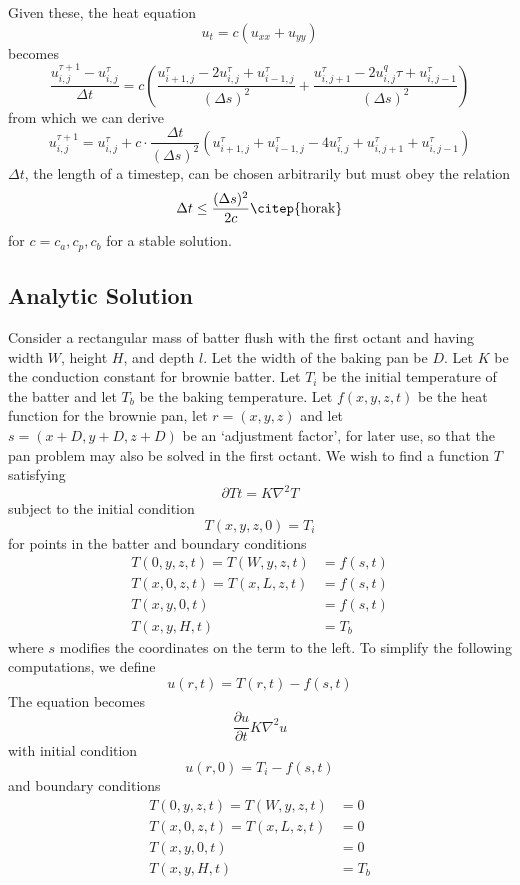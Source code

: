 \documentclass[12pt]{reedmcm}
\begin{document}
Given these, the heat equation
\[u_t = c (u_{xx} + u_{yy})\]
becomes
\[\dfrac{u_{i,j}^{\tau+1} - u_{i,j}^\tau}{\Delta t} = c  \left(\dfrac{u_{i+1,j}^\tau - 2u_{i,j}^\tau + u_{i-1,j}^\tau}{(\Delta s)^2} + \dfrac{u_{i,j+1}^\tau - 2u_{i,j}^q\tau + u_{i,j-1}^\tau}{(\Delta s)^2}\right)\]
from which we can derive
\[u_{i,j}^{\tau+1} = u_{i,j}^\tau + c \cdot \frac{\Delta t}{(\Delta s)^2} \left(u_{i+1,j}^\tau + u_{i-1,j}^\tau - 4u_{i,j}^\tau + u_{i,j+1}^\tau + u_{i,j-1}^\tau \right)\]
$\Delta t$, the length of a timestep, can be chosen arbitrarily but must obey the relation
\[\Delta t \leq \frac{(\Delta s)^2}{2c} \text{\citep{horak}}\]
for $c = c_a,c_p,c_b$ for a stable solution.\\


\subsection{Analytic Solution} 
Consider a rectangular mass of batter flush with the first octant and having width $W$, height $H$, and depth $l$.  Let the width of the baking pan be $D$.  Let $K$ be the conduction constant for brownie batter.  Let $T_i$ be the initial temperature of the batter and let $T_b$ be the baking temperature.  Let $f(x,y,z,t)$ be the heat function for the brownie pan, let $r = (x,y,z)$ and let $s = (x + D, y+D, z+D)$ be an `adjustment factor', for later use, so  that the pan problem may also be solved in the first octant.  We wish to find a function $T$ satisfying
\[\partial{T}{t} = K \nabla^2 T\]
subject to the initial condition
\[T(x,y,z,0) = T_i\]
for points in the batter and boundary conditions \begin{align*}
T(0,y,z,t) = T(W,y,z,t) &= f(s,t)\\
T(x,0,z,t) = T(x,L,z,t) &= f(s,t)\\
T(x,y,0,t) &= f(s,t)\\
T(x,y,H,t) &= T_b \end{align*}
where $s$ modifies the coordinates on the term to the left.
To simplify the following computations, we define
\[u(r,t) = T(r,t) - f(s,t)\]
The equation becomes 
\[\frac{\partial u}{\partial t} K \nabla^2 u\]
with initial condition
\[u(r,0) = T_i - f(s,t)\]
and boundary conditions \begin{align*}
T(0,y,z,t) = T(W,y,z,t) &= 0\\
T(x,0,z,t) = T(x,L,z,t) &= 0\\
T(x,y,0,t) &= 0\\
T(x,y,H,t) &= T_b\end{align*}
\end{document}
